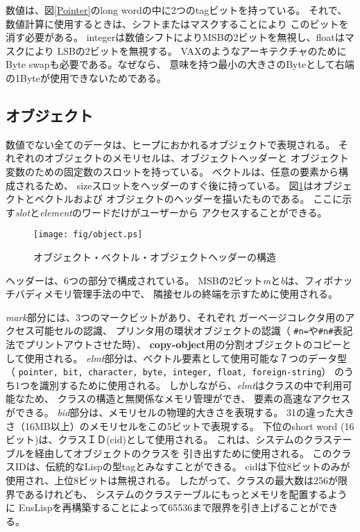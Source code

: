 数値は、図\ref{Pointer}のlong wordの中に2つのtagビットを持っている。
それで、数値計算に使用するときは、シフトまたはマスクすることにより
このビットを消す必要がある。
integerは数値シフトによりMSBの2ビットを無視し、floatはマスクにより
LSBの2ビットを無視する。
VAXのようなアーキテクチャのためにByte swapも必要である。なぜなら、
意味を持つ最小の大きさのByteとして右端の1Byteが使用できないためである。


\subsection{オブジェクト}
数値でない全てのデータは、ヒープにおかれるオブジェクトで表現される。
それぞれのオブジェクトのメモリセルは、オブジェクトヘッダーと
オブジェクト変数のための固定数のスロットを持っている。
ベクトルは、任意の要素から構成されるため、
sizeスロットをヘッダーのすぐ後に持っている。
図\ref{ObjectFig}はオブジェクトとベクトルおよび
オブジェクトのヘッダーを描いたものである。
ここに示す{\em slot}と{\em element}のワードだけがユーザーから
アクセスすることができる。


\begin{figure}[hbt]
\begin{center}
\texttt{[image: fig/object.ps]}
\end{center}
\caption{\label{ObjectFig}オブジェクト・ベクトル・オブジェクトヘッダーの構造}
\end{figure}

ヘッダーは、6つの部分で構成されている。
MSBの2ビット{\em m}と{\em b}は、フィボナッチバディメモリ管理手法の中で、
隣接セルの終端を示すために使用される。

{\em mark}部分には、3つのマークビットがあり、それぞれ
ガーベージコレクタ用のアクセス可能セルの認識、
プリンタ用の環状オブジェクトの認識（
{\tt \#n=}や{\tt \#n\#}表記法でプリントアウトさせた時）、
{\bf copy-object}用の分割オブジェクトのコピーとして使用される。
{\em elmt}部分は、ベクトル要素として使用可能な７つのデータ型（
{\tt pointer, bit, character, byte, integer, float, foreign-string}）
のうち1つを識別するために使用される。
しかしながら、{\em elmt}はクラスの中で利用可能なため、
クラスの構造と無関係なメモリ管理ができ、
要素の高速なアクセスができる。
{\em bid}部分は、メモリセルの物理的大きさを表現する。
31の違った大きさ（16MB以上）のメモリセルをこの5ビットで表現する。
下位のshort word (16ビット)は、クラスＩＤ(cid)として使用される。
これは、システムのクラステーブルを経由してオブジェクトのクラスを
引き出すために使用される。
このクラスIDは、伝統的なLispの型tagとみなすことができる。
cidは下位8ビットのみが使用され、上位8ビットは無視される。
したがって、クラスの最大数は256が限界であるけれども、
システムのクラステーブルにもっとメモリを配置するように
EusLispを再構築することによって65536まで限界を引き上げることができる。

